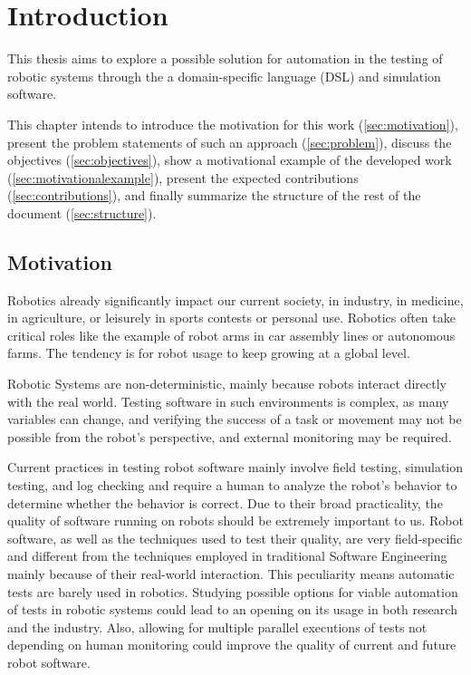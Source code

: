 \chapter{Introduction}
\label{chap:introduction}

This thesis aims to explore a possible solution for automation in the testing of robotic systems through the a domain-specific language (DSL) and simulation software.

This chapter intends to introduce the motivation for this work (\autoref{sec:motivation}), present the problem statements of such an approach (\autoref{sec:problem}), discuss the objectives (\autoref{sec:objectives}), show a motivational example of the developed work (\autoref{sec:motivationalexample}), present the expected contributions (\autoref{sec:contributions}), and finally summarize the structure of the rest of the document (\autoref{sec:structure}).


\section{Motivation}
\label{sec:motivation}

Robotics already significantly impact our current society, in industry, in medicine, in agriculture, or leisurely in sports contests or personal use. Robotics often take critical roles like the example of robot arms in car assembly lines or autonomous farms. The tendency is for robot usage to keep growing at a global level. 

Robotic Systems are non-deterministic, mainly because robots interact directly with the real world. Testing software in such environments is complex, as many variables can change, and verifying the success of a task or movement may not be possible from the robot's perspective, and external monitoring may be required.

Current practices in testing robot software mainly involve field testing, simulation testing, and log checking and require a human to analyze the robot's behavior to determine whether the behavior is correct. Due to their broad practicality, the quality of software running on robots should be extremely important to us. Robot software, as well as the techniques used to test their quality, are very field-specific and different from the techniques employed in traditional Software Engineering mainly because of their real-world interaction. This peculiarity means automatic tests are barely used in robotics. Studying possible options for viable automation of tests in robotic systems could lead to an opening on its usage in both research and the industry. Also, allowing for multiple parallel executions of tests not depending on human monitoring could improve the quality of current and future robot software.


